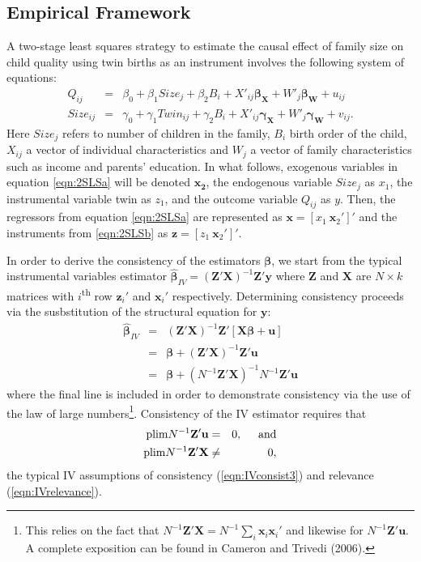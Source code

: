 \documentclass{article}[11pt,subeqn]
\newcommand{\vect}[1]{\mathbf{#1}}
\begin{document}
\begin{spacing}{1.25}
\section{Empirical Framework}
\label{scn:EF}
A two-stage least squares strategy to estimate the causal effect of family size on child quality using twin births as an instrument involves the following system of equations:
\begin{subequations}
\label{eqn:2SLS}
\begin{eqnarray}
\label{eqn:QQ}
Q_{ij}&=&\beta_0+\beta_1Size_j+\beta_2B_{i}+X'_{ij}\vect{\beta_{\vect{X}}}+W'_j\vect{\beta_\vect{W}}+u_{ij} \label{eqn:2SLSa}\\
Size_{ij}&=&\gamma_0+\gamma_1Twin_{ij}+\gamma_2B_{i}+X'_{ij}\vect{\gamma_\vect{X}}+W'_j\vect{\gamma_\vect{W}}+v_{ij}. \label{eqn:2SLSb}
 \end{eqnarray}
\end{subequations}
Here $Size_j$ refers to number of children in the family, $B_i$ birth order of the child, $X_{ij}$ a vector
of individual characteristics and $W_j$ a vector of family characteristics such as income and parents' education.
In what follows, exogenous variables in equation \ref{eqn:2SLSa} will be denoted $\mathbf{x_2}$, the
endogenous variable $Size_j$ as $x_1$, the instrumental variable twin as $z_1$, and the outcome variable
$Q_{ij}$ as $y$.  Then, the regressors from equation \ref{eqn:2SLSa} are represented as
$\vect{x}=[x_1\ \vect{x}_2']'$ and the instruments from \ref{eqn:2SLSb} as $\vect{z}=[z_1\ \vect{x}_2']'$.

In order to derive the consistency of the estimators $\vect{\beta}$, we start from the typical instrumental variables estimator
$\vect{\hat{\beta}}_{IV}=(\vect{Z}'\vect{X})^{-1}\vect{Z}'\vect{y} $
where $\vect{Z}$ and $\vect{X}$ are $N \times k$ matrices with $i$\textsuperscript{th} row $\vect{z}_i'$ and $\vect{x}_i'$ respectively.  
Determining consistency proceeds via the susbstitution of the structural equation for $\vect{y}$:
\begin{eqnarray}
\label{eqn:IVderive}
\vect{\hat{\beta}}_{IV}&=&(\vect{Z}'\vect{X})^{-1}\vect{Z}'[\vect{X\beta}+\vect{u}] \nonumber\\
&=&\vect{\beta}+(\vect{Z}'\vect{X})^{-1}\vect{Z}'\vect{u}\nonumber\\
&=&\vect{\beta}+(N^{-1}\vect{Z}'\vect{X})^{-1}N^{-1}\vect{Z}'\vect{u}
\end{eqnarray}
where the final line is included in order to demonstrate consistency via the use of the law of large numbers\footnote{This relies
on the fact that $N^{-1}\vect{Z}'\vect{X}=N^{-1}\sum_i\vect{x}_i\vect{x}_i'$ and likewise for $N^{-1}\vect{Z}'\vect{u}$.  A
complete exposition can be found in Cameron and Trivedi (2006).}.  Consistency of the IV estimator requires that
\begin{eqnarray}
\mathrm{plim} N^{-1}\vect{Z'u}&=&0, \hspace{5mm}\mathrm{and} \label{eqn:IVconsist3}\\ 
\mathrm{plim} N^{-1}\vect{Z'X}&\neq&0, \label{eqn:IVrelevance}
\end{eqnarray}
the typical IV assumptions of consistency (\ref{eqn:IVconsist3}) and relevance (\ref{eqn:IVrelevance}).  


\end{spacing}
\end{document}
